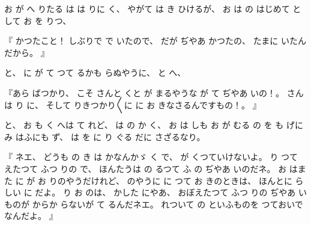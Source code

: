 %
お
が
へ
りたる
は
は
りに
く、
%
やがて
は
き
ひけるが、
%
お
は
の
はじめて
として
お
を
りつ、

%
『
かつたこと！
しぶりで
で
いたので、
%
だが
ぢやあ
かつたの、
%
たまに
いたんだから。
』

%
と、
%
に
が
て
つて
るかも
らぬやうに、
%
と
へ、

%
『あら
ばつかり、
%
こそ
さんと
くと
が
まるやうな
が
て
ぢやあ
いの！。
%
さんは
り
に、
%
そして
りきつかり〳〵に
に
お
きなさるんですもの！。
』

%
と、
%
お
も
く
へは
て
れど、
%
は
の
か
く、
%
お
は
しも
お
が
むる
の
を
も
げに
み
はふにも
ず、
%
は
を
に
り
ぐる
だに
さざるなり。

%
『
ネエ、
%
どうも
の
き
は
かなんかゞ
く
で、
%
が
くつていけないよ。
%
り
つて
えたつて%
ふつ
りの
で、
%
ほんたうは
の
るつて
ふ
の
ぢやあ
いのだネ。
%
お
はまた
に
が
お
りのやうだけれど、
%
のやうに
に
つて
お
きのときは、
%
ほんとに
らしい
に
だよ。
%
り
お
のは、
%
かした
にやあ、
%
おぼえたつて
ふつ
りの
ぢやあ
いものが
からか
らないが
て
るんだネエ。
%
れついて
の
といふものを
つておいでなんだよ。
』

